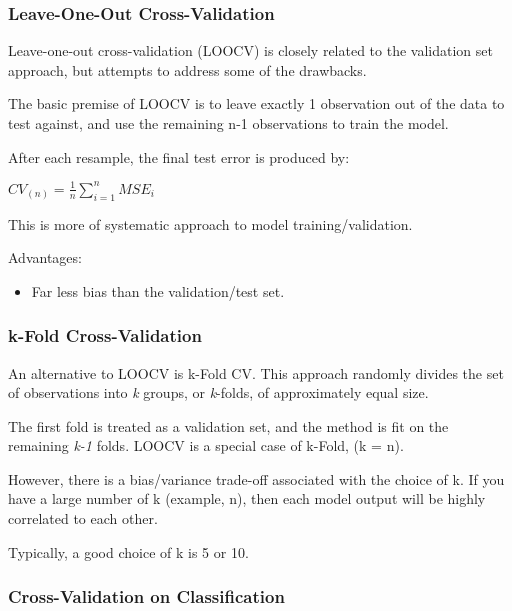 \documentclass[12pt,]{report}
\providecommand{\tightlist}{%
  \setlength{\itemsep}{0pt}\setlength{\parskip}{0pt}}
\begin{document}
\hypertarget{leave-one-out-cross-validation}{%
\subsubsection{Leave-One-Out
Cross-Validation}\label{leave-one-out-cross-validation}}

Leave-one-out cross-validation (LOOCV) is closely related to the
validation set approach, but attempts to address some of the drawbacks.

The basic premise of LOOCV is to leave exactly 1 observation out of the
data to test against, and use the remaining n-1 observations to train
the model.

After each resample, the final test error is produced by:

\(CV_{(n)} = \frac{1}{n}\sum^{n}_{i=1}{MSE_i}\)

This is more of systematic approach to model training/validation.

Advantages:

\begin{itemize}
\tightlist
\item
  Far less bias than the validation/test set.
\end{itemize}

\hypertarget{k-fold-cross-validation}{%
\subsubsection{k-Fold Cross-Validation}\label{k-fold-cross-validation}}

An alternative to LOOCV is k-Fold CV. This approach randomly divides the
set of observations into \emph{k} groups, or \emph{k}-folds, of
approximately equal size.

The first fold is treated as a validation set, and the method is fit on
the remaining \emph{k-1} folds. LOOCV is a special case of k-Fold, (k =
n).

However, there is a bias/variance trade-off associated with the choice
of k. If you have a large number of k (example, n), then each model
output will be highly correlated to each other.

Typically, a good choice of k is 5 or 10.

\hypertarget{cross-validation-on-classification}{%
\subsubsection{Cross-Validation on
Classification}\label{cross-validation-on-classification}}
\end{document}
